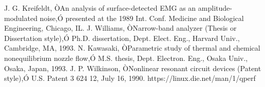 \documentclass[letterpaper, 10 pt, conference]{ieeeconf}  %
\begin{document}
\begin{thebibliography}{99}
 J. G. Kreifeldt, ÒAn analysis of surface-detected EMG as an amplitude-modulated noise,Ó presented at the 1989 Int. Conf. Medicine and Biological Engineering, Chicago, IL.
 J. Williams, ÒNarrow-band analyzer (Thesis or Dissertation style),Ó Ph.D. dissertation, Dept. Elect. Eng., Harvard Univ., Cambridge, MA, 1993. 
 N. Kawasaki, ÒParametric study of thermal and chemical nonequilibrium nozzle flow,Ó M.S. thesis, Dept. Electron. Eng., Osaka Univ., Osaka, Japan, 1993.
 J. P. Wilkinson, ÒNonlinear resonant circuit devices (Patent style),Ó U.S. Patent 3 624 12, July 16, 1990. 
 https://linux.die.net/man/1/qperf





\end{thebibliography}
\fi
\end{document}

